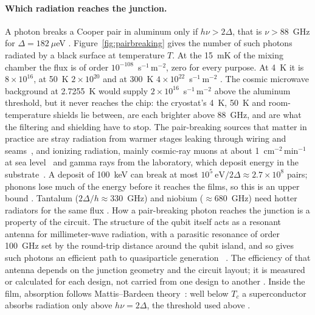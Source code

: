 \paragraph{Which radiation reaches the junction.} A photon breaks a Cooper pair in aluminum only if $h\nu>2\Delta$,
that is $\nu>88$~GHz for $\Delta=182~\mu$eV \calc. Figure~\ref{fig:pairbreaking} gives the number of such photons
radiated by a black surface at temperature $T$. At the 15~mK of the mixing chamber the flux is
of order $10^{-108}$~s$^{-1}$\,m$^{-2}$, zero for every purpose. At 4~K it is $8\times10^{16}$, at 50~K $2\times10^{20}$
and at 300~K $4\times10^{22}$~s$^{-1}$\,m$^{-2}$ \calc. The cosmic microwave background at 2.7255~K would supply
$2\times10^{16}$~s$^{-1}$\,m$^{-2}$ above the aluminum threshold, but it never reaches the chip: the cryostat's 4~K,
50~K and room-temperature shields lie between, are each brighter above 88~GHz, and are what the filtering and shielding
have to stop. The pair-breaking sources that matter in practice are stray radiation from warmer stages leaking through
wiring and seams~\cite{Barends2011,Liu2024PBP}, and ionizing radiation, mainly cosmic-ray muons at about
1~cm$^{-2}$\,min$^{-1}$ at sea level~\cite{PDG2024} and gamma rays from the laboratory, which deposit energy in the
substrate~\cite{Vepsalainen2020,Cardani2021,McEwen2022}. A deposit of 100~keV can break at most
$10^{5}~\mathrm{eV}/2\Delta\approx2.7\times10^{8}$ pairs; phonons lose much of the energy before it reaches the films,
so this is an upper bound \calc. Tantalum ($2\Delta/h\approx330$~GHz) and niobium ($\approx680$~GHz) need hotter
radiators for the same flux \calc.
How a pair-breaking photon reaches the junction is a property of the circuit. The structure of the qubit itself acts as a resonant
antenna for millimeter-wave radiation, with a parasitic resonance of order 100~GHz set by the round-trip distance around the qubit
island, and so gives such photons an efficient path to quasiparticle generation~\cite{Liu2024PBP} \observed. The efficiency of that
antenna depends on the junction geometry and the circuit layout; it is measured or calculated for each design, not carried from one
design to another \interp. Inside the film, absorption follows Mattis--Bardeen theory~\cite{MattisBardeen1958}: well below $T_c$ a
superconductor absorbs radiation only above $h\nu=2\Delta$, the threshold used above \derived.
